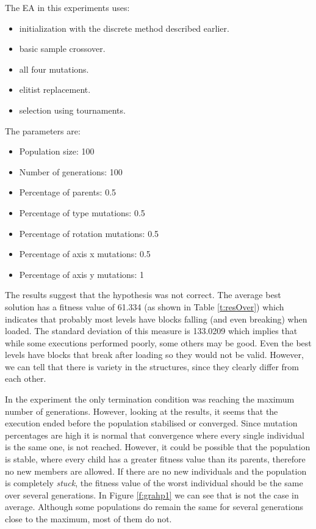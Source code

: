 \documentclass[runningheads,a4paper]{llncs}
\begin{document}
The EA in this experiments uses:
\begin{itemize}
	\item  initialization with the discrete method described earlier.
	\item  basic sample crossover.
	\item  all four mutations.
	\item  elitist replacement.
	\item  selection using tournaments.
\end{itemize}

The parameters are:
\begin{itemize}
	\item Population size: 100
	\item Number of generations: 100
	\item Percentage of parents: 0.5
	\item Percentage of type mutations: 0.5
	\item Percentage of rotation mutations: 0.5
	\item Percentage of axis x mutations: 0.5
	\item Percentage of axis y mutations: 1
\end{itemize}

The results suggest that the hypothesis was not correct. The average best 
solution has a fitness value of 61.334 (as shown in Table \ref{t:resOver}) 
which indicates that probably most levels have blocks falling (and even 
breaking) when loaded. The standard deviation of this measure is 133.0209 which 
implies that while some executions performed poorly, some others may be good. 
Even the best levels have blocks that break after loading so they would not be 
valid. However, we can tell that there is variety in the structures, since they 
clearly differ from each other. 

In the experiment the only termination condition was reaching the maximum 
number of generations. However, looking at the results, it seems that the 
execution ended before the population stabilised or converged. Since mutation 
percentages are high it is normal that convergence where every single 
individual is the same one, is not reached. However, it could be possible that 
the population is stable, where every child has a greater fitness value than 
its parents, therefore no new members are allowed. If there are no new 
individuals and the population is completely \textit{stuck}, the fitness value 
of the worst individual should be the same over several generations. In Figure 
\ref{f:grahp1} we can see that is not the case in average. Although some 
populations do remain the same for several generations close to the maximum, 
most of them do not.
\end{document}
